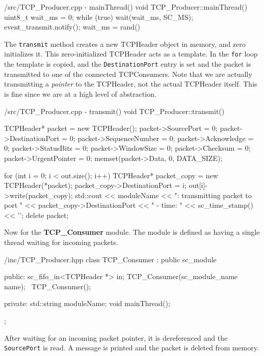 \documentclass[../main.tex]{subfiles}
\begin{document}
\begin{myminted}{/src/TCP\_Producer.cpp - mainThread()}
void TCP_Producer::mainThread() {
    uint8_t wait_ms = 0;
    while (true) {
        wait(wait_ms, SC_MS); 
        event_transmit.notify();
        wait_ms = rand() %
    }
}
\end{myminted}

The \texttt{transmit} method creates a new TCPHeader object in memory, and zero initializes it. This zero-initialized TCPHeader acts as a template. In the \texttt{for} loop the template is copied, and the \texttt{DestinationPort} entry is set and the packet is transmitted to one of the connected TCPConsumers. Note that we are actually transmitting a \textit{pointer} to the TCPHeader, not the actual TCPHeader itself. This is fine since we are at a high level of abstraction. 

\begin{myminted}{/src/TCP\_Producer.cpp - transmit()}
void TCP_Producer::transmit() {
    TCPHeader* packet = new TCPHeader();
    packet->SourcePort         = 0;
    packet->DestinationPort    = 0;
    packet->SequenceNumber     = 0;    
    packet->Acknowledge        = 0;
    packet->StatusBits         = 0;
    packet->WindowSize         = 0;
    packet->Checksum           = 0;
    packet->UrgentPointer      = 0;
    memset(packet->Data, 0, DATA_SIZE);

    for (int i = 0; i < out.size(); i++) {
        TCPHeader* packet_copy = new TCPHeader(*packet);
        packet_copy->DestinationPort = i;
        out[i]->write(packet_copy);
        std::cout << moduleName << ": transmitting packet to port " 
        << packet_copy->DestinationPort
        << " - time: " << sc_time_stamp() << '\n';
    }
    delete packet;
}
\end{myminted}

\newpage

Now for the \textbf{TCP\_Consumer} module. The module is defined as having a single thread waiting for incoming packets.

\begin{myminted}{/inc/TCP\_Producer.hpp}
class TCP_Consumer : public sc_module {
public:
    sc_fifo_in<TCPHeader *> in;
    TCP_Consumer(sc_module_name name);
    ~TCP_Consumer();

private:
    std::string moduleName;
    void mainThread();
};
\end{myminted}

After waiting for an incoming packet pointer, it is dereferenced and the \texttt{SourcePort} is read. A message is printed and the packet is deleted from memory.
\end{document}
